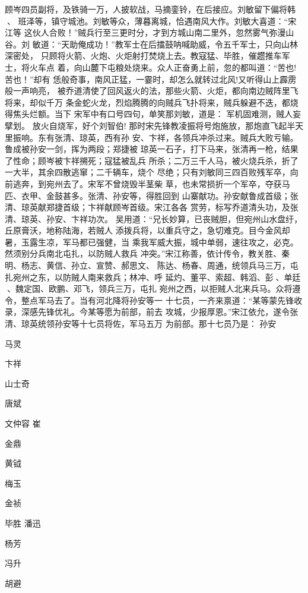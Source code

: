 顾岑四员副将，及铁骑一万，人披软战，马摘銮铃，在后接应。刘敏留下偏将韩、
班泽等，镇守城池。刘敏等众，薄暮离城，恰遇南风大作。刘敏大喜道：“宋江等
这伙人合败！”贼兵行至三更时分，才到方城山南二里外，忽然雾气弥漫山谷。刘
敏道：“天助俺成功！”教军士在后擂鼓呐喊助威，令五千军士，只向山林深密处，
只顾将火箭、火炮、火炬射打焚烧上去。教寇猛、毕胜，催趱推车军士，将火车点
着，向山麓下屯粮处烧来。众人正奋勇上前，忽的都叫道：“苦也!苦也！”却有
恁般奇事，南风正猛，一霎时，却怎么就转过北风!又听得山上霹雳般一声响亮，
被乔道清使了回风返火的法，那些火箭、火炬，都向南边贼阵里飞将来，却似千万
条金蛇火龙，烈焰腾腾的向贼兵飞扑将来，贼兵躲避不迭，都烧得焦头烂额。当下
宋军中有口号四句，单笑那刘敏，道是：
军机固难测，贼人妄擘划。
放火自烧军，好个刘智伯!
那时宋先锋教凌振将号炮施放，那炮直飞起半天里振响。东有张清、琼英，西有孙
安、卞祥，各领兵冲杀过来。贼兵大败亏输。鲁成被孙安一剑，挥为两段；郑捷被
琼英一石子，打下马来，张清再一枪，结果了性命；顾岑被卞祥搠死；寇猛被乱兵
所杀；二万三千人马，被火烧兵杀，折了一大半，其余四散逃窜；二千辆车，烧个
尽绝；只有刘敏同三四百败残军卒，向前逃奔，到宛州去了。宋军不曾烧毁半茎柴
草，也未常损折一个军卒，夺获马匹、衣甲、金鼓甚多。张清、孙安等，得胜回到
山寨献功。孙安献鲁成首级；张清、琼英献郑捷首级；卞祥献顾岑首级。宋江各各
赏劳，标写乔道清头功，及张清、琼英、孙安、卞祥功次。
吴用道：“兄长妙算，已丧贼胆，但宛州山水盘纡，丘原膏沃，地称陆海，若贼人
添拨兵将，以重兵守之，急切难克。目今金风却暑，玉露生凉，军马都已强健，当
乘我军威大振，城中单弱，速往攻之，必克。然须别分兵南北屯扎，以防贼人救兵
冲突。”宋江称善，依计传令，教关胜、秦明、杨志、黄信、孙立、宣赞、郝思文、
陈达、杨春、周通，统领兵马三万，屯扎宛州之东，以防贼人南来救兵；林冲、呼
延灼、董平、索超、韩滔、彭、单廷、魏定国、欧鹏、邓飞，领兵三万，屯扎
宛州之西，以拒贼人北来兵马。众将遵令，整点军马去了。当有河北降将孙安等一
十七员，一齐来禀道：“某等蒙先锋收录，深感先锋优礼。今某等愿为前部，前去
攻城，少报厚恩。”宋江依允，遂令张清、琼英统领孙安等十七员将佐，军马五万
为前部。那十七员乃是：
孙安

马灵

卞祥

山士奇

唐斌

文仲容
崔

金鼎

黄钺

梅玉

金祯

毕胜
潘迅

杨芳

冯升

胡避


